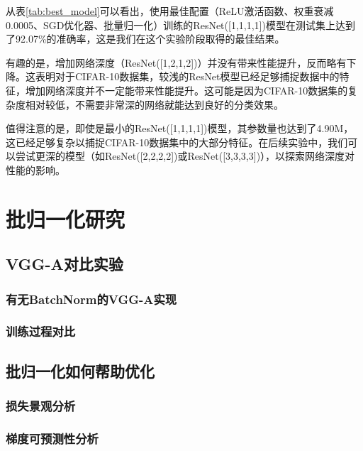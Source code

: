 \documentclass[12pt,a4paper]{article}
\begin{document}
从表\ref{tab:best_model}可以看出，使用最佳配置（ReLU激活函数、权重衰减0.0005、SGD优化器、批量归一化）训练的ResNet([1,1,1,1])模型在测试集上达到了92.07\%的准确率，这是我们在这个实验阶段取得的最佳结果。

有趣的是，增加网络深度（ResNet([1,2,1,2])）并没有带来性能提升，反而略有下降。这表明对于CIFAR-10数据集，较浅的ResNet模型已经足够捕捉数据中的特征，增加网络深度并不一定能带来性能提升。这可能是因为CIFAR-10数据集的复杂度相对较低，不需要非常深的网络就能达到良好的分类效果。

值得注意的是，即使是最小的ResNet([1,1,1,1])模型，其参数量也达到了4.90M，这已经足够复杂以捕捉CIFAR-10数据集中的大部分特征。在后续实验中，我们可以尝试更深的模型（如ResNet([2,2,2,2])或ResNet([3,3,3,3])），以探索网络深度对性能的影响。


\section{批归一化研究}

\subsection{VGG-A对比实验}
\subsubsection{有无BatchNorm的VGG-A实现}

\subsubsection{训练过程对比}

\subsection{批归一化如何帮助优化}
\subsubsection{损失景观分析}

\subsubsection{梯度可预测性分析}

\end{document}

